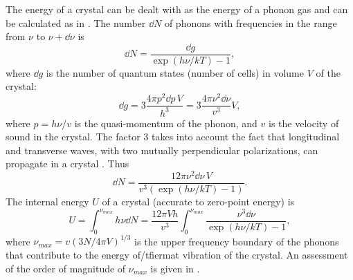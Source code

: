 The energy of a crystal can be dealt with as the energy of a phonon gas and can be calculated as in . The number $\dd N$ of phonons with frequencies in the range from $\nu$ to $\nu + \dd \nu$ is
\begin{equation*}%
\dd N = \frac{\dd g}{\exp (h \nu/k T)-1},
\end{equation*}
where $\dd g$ is the number of quantum states (number of cells) in volume $V$ of the crystal:
\begin{equation*}%
\dd g = 3 \frac{4 \pi p^{2} \dd p \, V}{h^{3}} = 3 \frac{4 \pi \nu^{2} \dd \nu}{v^{3}} V,
\end{equation*}
where $p = h\nu/v$ is the quasi-momentum of the phonon, and $v$ is the velocity of sound in the crystal. The factor 3 takes into account the fact that longitudinal and transverse waves, with two mutually perpendicular polarizations, can propagate in a crystal . Thus
\begin{equation*}%
\dd N = \frac{12 \pi \nu^{2} \dd \nu \, V}{v^{3}(\exp (h \nu/k T)-1)}.
\end{equation*}
The internal energy $U$  of a crystal (accurate to zero-point energy) is
\begin{equation*}%
U = \int_{0}^{\nu_{max}}h \nu \dd N = \frac{12 \pi  Vh}{v^{3}} 
\int_{0}^{\nu_{max}} \frac{\nu^{3} \dd \nu}{\exp (h \nu/k T)-1},
\end{equation*}
where $\nu_{max} = v (3N/4 \pi V)^{1/3}$ is the upper frequency boundary of the phonons that contribute to the energy of/tfiermat vibration of the crystal. An assessment of the order of magnitude of $\nu_{max}$ is given in .

